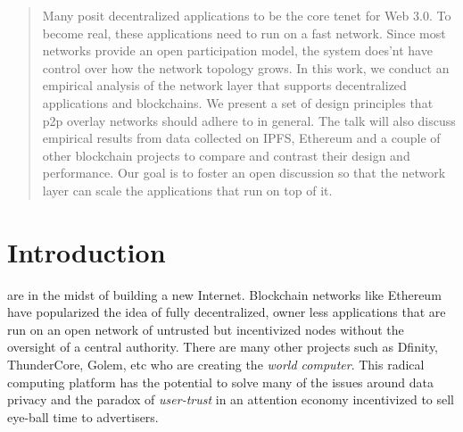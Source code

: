\documentclass[journal]{IEEEtran}
\begin{document}
\maketitle

\begin{abstract}

Many posit decentralized applications to be the core tenet for Web 3.0. To become real, these applications need to run on a
    fast network. Since most networks provide an open participation model, the system does'nt have control over how the
    network topology grows. In this work, we conduct an empirical analysis of the network layer that supports decentralized applications and blockchains. 
    We present a set of design principles that p2p overlay networks should adhere to in general. The talk will also
    discuss empirical results from data collected on IPFS, Ethereum and a couple of other blockchain projects to compare
    and contrast their design and performance. Our goal is to foster an open discussion so that the network layer can
    scale the applications that run on top of it.

\end{abstract}

%
\IEEEpeerreviewmaketitle

\section{Introduction}
 are in the midst of building a new Internet. Blockchain networks like Ethereum have popularized the idea of
fully decentralized, owner less applications that are run on an open network of untrusted but incentivized nodes without the
oversight of a central authority. There are many other projects such as Dfinity, ThunderCore, Golem, etc who are
creating the {\em world computer}. This radical computing platform has the potential to solve many of the issues around
data privacy and the paradox of {\it user-trust} in an attention economy \cite{trust_att} incentivized to sell eye-ball
time to advertisers.
\end{document}
